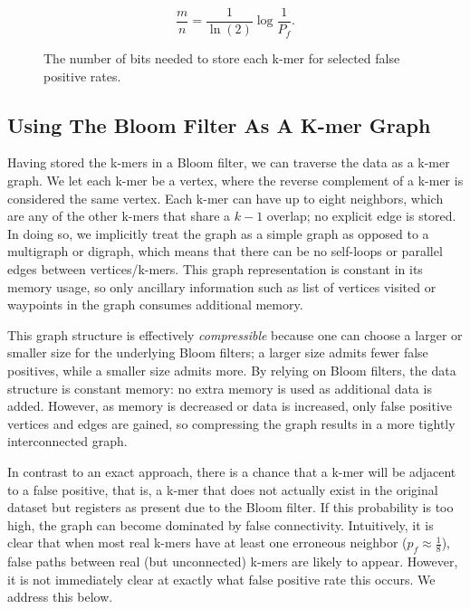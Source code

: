 \documentclass[12pt]{article} \usepackage{simplemargins}
\begin{document}
\begin{displaymath}
\frac{m}{n} = \frac{1}{\ln(2)} \log{\frac{1}{P_f}}.
\end{displaymath}

\begin{figure}
\caption{The number of bits needed to store each k-mer for selected
false positive rates.}
\end{figure}

\subsection{Using The Bloom Filter As A K-mer Graph}
Having stored the k-mers in a Bloom filter, we can traverse
the data as a k-mer graph. We let each k-mer be a vertex, where
the reverse complement of a k-mer is considered the same
vertex. Each k-mer can
have up to eight neighbors, which are any of the other k-mers that
 share a $k-1$
overlap; no explicit edge is stored. In doing so, we implicitly 
treat the graph as a simple graph as opposed to a multigraph or 
digraph, which means that there can be no self-loops or parallel 
edges between vertices/k-mers. This graph representation is constant 
in its memory usage, so only ancillary information such as list 
of vertices visited or waypoints in the graph consumes additional 
memory.

This graph structure is effectively {\em compressible}
because one can choose a larger
or smaller size for the underlying Bloom filters; a larger size admits fewer
false positives, while a smaller size admits more. By relying on Bloom
filters, the data structure is constant memory: no extra memory is
used as additional data is added. However, as memory is decreased or data
is increased, only false positive vertices and edges are gained, so
compressing the graph results in a more tightly interconnected graph.

In contrast to an exact approach, there is a chance that a k-mer 
will be adjacent to a false positive,
that is, a k-mer
that does not actually exist in the original dataset but registers as present  
due to 
the Bloom filter. If this probability is too high, the 
graph can become dominated by false connectivity. 
Intuitively, it is clear that when most real k-mers
have at least one erroneous neighbor ($p_f \approx \frac{1}{8}$), 
false paths between real (but unconnected) k-mers are likely to 
appear. However, it is not immediately clear at exactly what 
false positive rate this occurs. We address this below.  %
\end{document}
